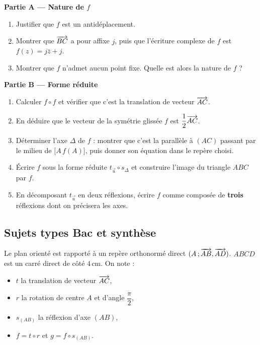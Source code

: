 \begin{center}
\end{center}

\textbf{Partie A — Nature de $f$}
\begin{enumerate}
	\item Justifier que $f$ est un antidéplacement.
	\item Montrer que $\overrightarrow{BC}$ a pour affixe $j$, puis que l'écriture
	complexe de $f$ est $f(z)=j\bar z+j$.
	\item Montrer que $f$ n'admet aucun point fixe. Quelle est alors la nature
	de $f$ ?
\end{enumerate}

\textbf{Partie B — Forme réduite}
\begin{enumerate}
	\item Calculer $f\circ f$ et vérifier que c'est la translation de vecteur
	$\overrightarrow{AC}$.
	\item En déduire que le vecteur de la symétrie glissée $f$ est
	$\dfrac12\overrightarrow{AC}$.
	\item Déterminer l'axe $\Delta$ de $f$ : montrer que c'est la parallèle à
	$(AC)$ passant par le milieu de $\bigl[A\,f(A)\bigr]$, puis donner son
	équation dans le repère choisi.
	\item Écrire $f$ sous la forme réduite $t_{\vec u}\circ s_{\Delta}$ et
	construire l'image du triangle $ABC$ par $f$.
	\item En décomposant $t_{\vec u}$ en deux réflexions, écrire $f$ comme
	composée de \textbf{trois} réflexions dont on précisera les axes.
\end{enumerate}

\subsection{Sujets types Bac et synthèse}

Le plan orienté est rapporté à un repère orthonormé direct
$(A\,;\overrightarrow{AB},\overrightarrow{AD})$. $ABCD$ est un carré direct de côté $4\,$cm.
On note :
\begin{itemize}[label=\textbullet]
	\item $t$ la translation de vecteur $\overrightarrow{AC}$,
	\item $r$ la rotation de centre $A$ et d'angle $\dfrac{\pi}{2}$,
	\item $s_{(AB)}$ la réflexion d'axe $(AB)$,
	\item $f = t\circ r$ et $g = f\circ s_{(AB)}$.
\end{itemize}

